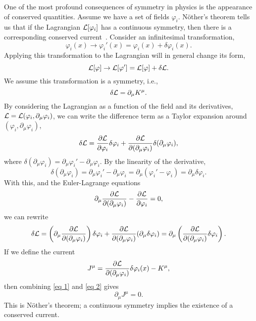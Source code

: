 One of the most profound consequences of symmetry in physics is the appearance of conserved quantities.
Assume we have a set of fields $\varphi_i$. Nöther's theorem tells us that if the Lagrangian $\mathcal L[\varphi_i]$ has a continuous symmetry, then there is a corresponding conserved current~\autocite{carrollSpacetimeGeometryIntroduction2019,peskinIntroductionQuantumField1995}.
Consider an infinitesimal transformation,
%
\begin{equation}
    \varphi_i(x) \longrightarrow \varphi_i'(x)
    = \varphi_i(x) + \delta \varphi_i(x).
\end{equation}
%
Applying this transformation to the Lagrangian will in general change its form,
%
\begin{equation}
    \mathcal L[\varphi] \rightarrow \mathcal L[\varphi']
    = \mathcal L[\varphi] + \delta \mathcal L.
\end{equation}
%
We assume this transformation is a symmetry, i.e.,
%
\begin{equation}
    \label{eq 1}
    \delta \mathcal L = \partial_\mu K^\mu.
\end{equation}
%
By considering the Lagrangian as a function of the field and its derivatives, $\mathcal L = \mathcal L(\varphi_i, \partial_\mu \varphi_i)$, we can write the difference term as a Taylor expansion around $(\varphi_i, \partial_\mu \varphi_i)$,
%
\begin{align}
    \delta \Ell
    = \pdv{\Ell}{\varphi_i} \delta \varphi_i
    + \pdv{\Ell}{(\partial_\mu \varphi_i)} \delta (\partial_\mu \varphi_i),
\end{align}
%
where $\delta (\partial_\mu \varphi_i) = \partial_\mu \varphi_i' - \partial_\mu \varphi_i$.
By the linearity of the derivative,
%
\begin{equation}
    \delta (\partial_\mu \varphi_i)
    = \partial_\mu \varphi_i' - \partial_\mu \varphi_i
    = \partial_\mu (\varphi_i' - \varphi_i)
    = \partial_\mu \delta \varphi_i.
\end{equation}
%
With this, and the Euler-Lagrange equations
%
\begin{equation}
    \partial_\mu \pdv{\Ell}{(\partial_\mu \varphi_i)} - \pdv{\Ell}{\varphi_i} = 0,
\end{equation}
%
we can rewrite
%
\begin{equation}
    \label{eq 2}
    \delta \Ell = \left( \partial_\mu \pdv{\Ell}{(\partial_\mu \varphi_i)} \right) \delta \varphi_i
    + \pdv{\Ell}{(\partial_\mu \varphi_i)} (\partial_\mu \delta \varphi_i)
    = \partial_\mu \left(\pdv{\Ell}{(\partial_\mu \varphi_i)} \delta \varphi_i\right).
\end{equation}
%
If we define the current
%
\begin{equation}
    J^\mu = \pdv{\Ell}{(\partial_\mu \varphi_i)} \delta \varphi_i(x) - K^\mu,
\end{equation}
%
then combining \autoref{eq 1} and \autoref{eq 2} gives
%
\begin{equation}
    \label{Nothers theorem}
    \partial_\mu J^\mu = 0.
\end{equation}
%
This is Nöther's theorem; a continuous symmetry implies the existence of a conserved current.

